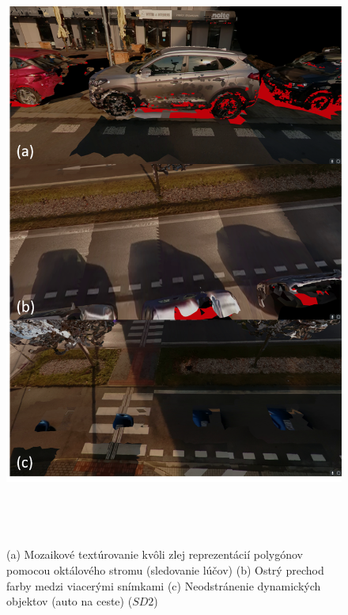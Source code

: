 \begin{figure}[!htbp]
  \centering
  \includegraphics[width=16cm, height=20cm]{img/texturing_problems.png}
  \caption{(a) Mozaikové textúrovanie kvôli zlej reprezentácií polygónov pomocou oktálového stromu (sledovanie lúčov) (b) Ostrý prechod farby medzi viacerými snímkami (c) Neodstránenie dynamických objektov (auto na ceste) ($SD2$)} 
  \label{fig:texturing_problems}
\end{figure}
\vfill\clearpage  